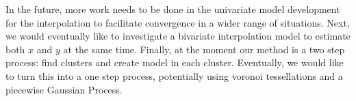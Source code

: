 \documentclass[12pt]{article}
\begin{document}
In the future, more work needs to be done in the univariate model
development for the interpolation to facilitate convergence in a wider
range of situations. Next, we would eventually like to investigate a
bivariate interpolation model to estimate both \(x\) and \(y\) at the
same time. Finally, at the moment our method is a two step process: find
clusters and create model in each cluster. Eventually, we would like to
turn this into a one step process, potentially using voronoi
tessellations and a piecewise Gaussian Process.



\end{document}
